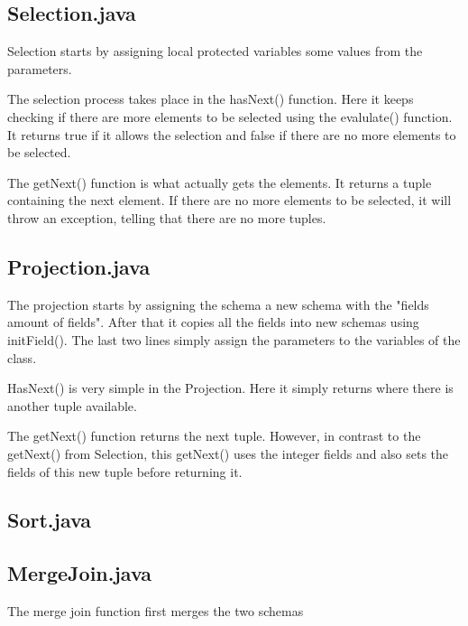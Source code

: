 \documentclass[a4paper,10pt,titlepage]{report}
\begin{document}
\subsection{Selection.java}
Selection starts by assigning local protected variables some values from the parameters. 

The selection process takes place in the hasNext() function. Here it keeps checking if there are more elements to be selected using the evalulate() function. It returns true if it allows the selection and false if there are no more elements to be selected.

The getNext() function is what actually gets the elements. It returns a tuple containing the next element. If there are no more elements to be selected, it will throw an exception, telling that there are no more tuples.

\vspace{10mm}
\subsection{Projection.java}
The projection starts by assigning the schema a new schema with the "fields amount of fields". After that it copies all the fields into new schemas using initField(). The last two lines simply assign the parameters to the variables of the class.

HasNext() is very simple in the Projection. Here it simply returns where there is another tuple available.

The getNext() function returns the next tuple. However, in contrast to the getNext() from Selection, this getNext() uses the integer fields and also sets the fields of this new tuple before returning it.



\subsection{Sort.java}

\subsection{MergeJoin.java}
The merge join function first merges the two schemas

\end{document}
